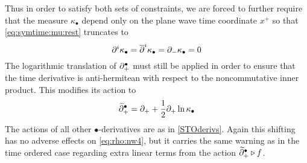 Thus in order to satisfy both sets of constraints, we are forced to further
require that the measure $\kappa_\bullet$ depend only on the plane wave time
coordinate $x^+$ so that \eqref{eq:symtime:mu:rest} truncates to
\begin{equation}
  \label{eq:symtime:mu}
  \partial^i\kappa_\bullet=\overline{\partial}^{ i}\kappa_\bullet=\partial_-\kappa_\bullet=0 
\end{equation}
The logarithmic translation of $\partial_+^\bullet$ must still be applied in order to
ensure that the time derivative is anti-hermitean with respect to the
noncommutative inner product. This modifies its action to
\begin{equation}
  \label{eq:symtime:d}
  \widetilde{\partial}^{ \bullet}_+=\partial_++ \frac12 \partial_+\ln\kappa_\bullet
\end{equation}
The actions of all other $\bullet$-derivatives are as in \eqref{STOderivs}.
Again this shifting has no adverse effects on \eqref{eq:rho:nw4}, but it carries
the same warning as in the time ordered case regarding extra linear terms from
the action $\widetilde{\partial}^{ \bullet}_+\triangleright f$.

